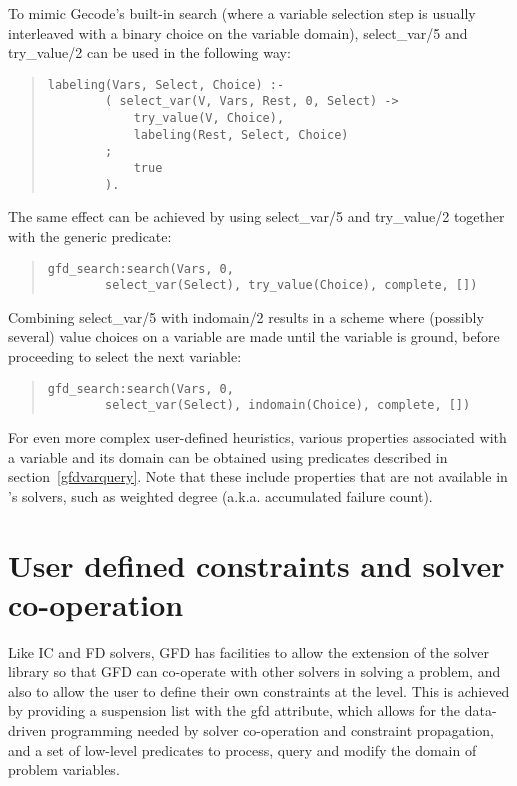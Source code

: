 To mimic Gecode's built-in search (where a variable selection step is usually
interleaved with a binary choice on the variable domain), select_var/5 and
try_value/2 can be used in the following way:
\begin{quote}
\begin{verbatim}
labeling(Vars, Select, Choice) :-
        ( select_var(V, Vars, Rest, 0, Select) ->
            try_value(V, Choice),
            labeling(Rest, Select, Choice)
        ;
            true
        ).
\end{verbatim}
\end{quote}
The same effect can be achieved by using select_var/5 and try_value/2
together with the generic
predicate:
\begin{quote}
\begin{verbatim}
gfd_search:search(Vars, 0,
        select_var(Select), try_value(Choice), complete, [])
\end{verbatim}
\end{quote}
Combining select_var/5 with indomain/2 results in a scheme where
(possibly several) value choices on a variable are made until the
variable is ground, before proceeding to select the next variable:
\begin{quote}
\begin{verbatim}
gfd_search:search(Vars, 0,
        select_var(Select), indomain(Choice), complete, [])
\end{verbatim}
\end{quote}
For even more complex user-defined heuristics, various properties associated
with a variable and its domain can be obtained using predicates described
in section~\ref{gfdvarquery}. Note that these include properties that are not
available in
\eclipse's solvers, such as weighted degree (a.k.a. accumulated failure count).



\section{User defined constraints and solver co-operation}
Like IC and FD solvers, GFD has facilities to allow the extension of the 
solver library so that GFD can co-operate with other solvers in solving a
problem, and also to allow the user to define their own constraints at the {\eclipse}
level. This is achieved by providing a suspension list with the gfd attribute,
which allows for the data-driven programming needed by solver co-operation and
constraint propagation, and a set of low-level predicates to process,
 query and  modify the domain of problem variables.

